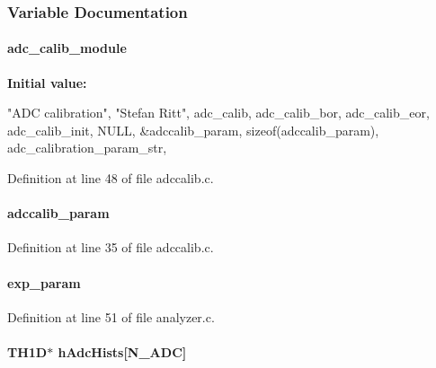 \subsubsection{Variable Documentation}
\paragraph[{adc\_\-calib\_\-module}]{ {\bf adc\_\-calib\_\-module}}\hfill\label{adccalib_8c_a6316036c6b9ab6ab3d9932cfa86e1ae5}
{\bfseries Initial value:}
\begin{DoxyCode}
 {
   "ADC calibration",           
   "Stefan Ritt",               
   adc_calib,                   
   adc_calib_bor,               
   adc_calib_eor,               
   adc_calib_init,              
   NULL,                        
   &adccalib_param,             
   sizeof(adccalib_param),      
   adc_calibration_param_str,   
}
\end{DoxyCode}


Definition at line 48 of file adccalib.c.
\paragraph[{adccalib\_\-param}]{ {\bf adccalib\_\-param}}\hfill\label{adccalib_8c_a5b84b1ab630f7d978e438624d9ca560a}


Definition at line 35 of file adccalib.c.
\paragraph[{exp\_\-param}]{ {\bf exp\_\-param}}\hfill\label{adccalib_8c_a6f1a7395cc240fde69229adefec8127f}


Definition at line 51 of file analyzer.c.
\paragraph[{hAdcHists}]{\setlength{\rightskip}{0pt plus 5cm}TH1D$\ast$ {\bf hAdcHists}\mbox{[}N\_\-ADC\mbox{]}}\hfill\label{adccalib_8c_a12b1bdb88b97f4cf23ff0a70ceb81f54}


